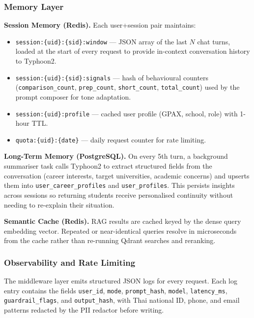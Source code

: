 ﻿\documentclass[12pt,a4paper]{article}
\begin{document}
\subsubsection{Memory Layer}

\textbf{Session Memory (Redis).} Each user+session pair maintains:
\begin{itemize}[leftmargin=2em]
    \item \texttt{session:\{uid\}:\{sid\}:window} — JSON array of the last $N$
    chat turns, loaded at the start of every request to provide in-context
    conversation history to Typhoon2.
    \item \texttt{session:\{uid\}:\{sid\}:signals} — hash of behavioural counters
    (\texttt{comparison\_count}, \texttt{prep\_count}, \texttt{short\_count},
    \texttt{total\_count}) used by the prompt composer for tone adaptation.
    \item \texttt{session:\{uid\}:profile} — cached user profile (GPAX, school,
    role) with 1-hour TTL.
    \item \texttt{quota:\{uid\}:\{date\}} — daily request counter for rate limiting.
\end{itemize}

\textbf{Long-Term Memory (PostgreSQL).} On every 5th turn, a background summariser
task calls Typhoon2 to extract structured fields from the conversation (career
interests, target universities, academic concerns) and upserts them into
\texttt{user\_career\_profiles} and \texttt{user\_profiles}. This persists insights
across sessions so returning students receive personalised continuity without needing
to re-explain their situation.

\textbf{Semantic Cache (Redis).} RAG results are cached keyed by the dense query
embedding vector. Repeated or near-identical queries resolve in microseconds from
the cache rather than re-running Qdrant searches and reranking.

\subsubsection{Observability and Rate Limiting}

The middleware layer emits structured JSON logs for every request. Each log entry
contains the fields \texttt{user\_id}, \texttt{mode}, \texttt{prompt\_hash},
\texttt{model}, \texttt{latency\_ms}, \texttt{guardrail\_flags}, and
\texttt{output\_hash}, with Thai national ID, phone, and email patterns redacted
by the PII redactor before writing.
\end{document}
